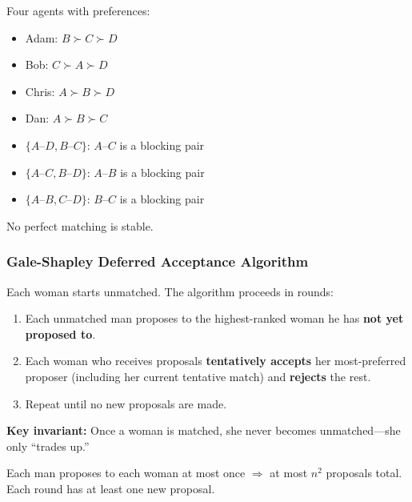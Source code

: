 \begin{exbox}
Four agents with preferences:
\begin{itemize}
  \item Adam: $B \succ C \succ D$
  \item Bob: $C \succ A \succ D$
  \item Chris: $A \succ B \succ D$
  \item Dan: $A \succ B \succ C$
\end{itemize}

\begin{itemize}
  \item $\{A\text{--}D, B\text{--}C\}$: $A$--$C$ is a blocking pair
  \item $\{A\text{--}C, B\text{--}D\}$: $A$--$B$ is a blocking pair
  \item $\{A\text{--}B, C\text{--}D\}$: $B$--$C$ is a blocking pair
\end{itemize}
No perfect matching is stable.
\end{exbox}

\bigseparator

\subsubsection{Gale-Shapley Deferred Acceptance Algorithm}

\begin{defbox}
Each woman starts unmatched. The algorithm proceeds in rounds:
\begin{enumerate}
  \item Each unmatched man proposes to the highest-ranked woman he has \textbf{not yet proposed to}.
  \item Each woman who receives proposals \textbf{tentatively accepts} her most-preferred proposer (including her current tentative match) and \textbf{rejects} the rest.
  \item Repeat until no new proposals are made.
\end{enumerate}

\textbf{Key invariant:} Once a woman is matched, she never becomes unmatched---she only ``trades up.''
\end{defbox}

\begin{thmbox}
Each man proposes to each woman at most once $\Rightarrow$ at most $n^2$ proposals total. Each round has at least one new proposal.
\end{thmbox}

